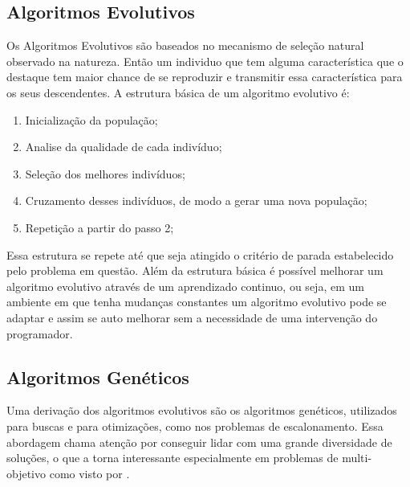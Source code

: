     \subsection{Algoritmos Evolutivos}
        Os Algoritmos Evolutivos são baseados no mecanismo de seleção natural observado na natureza. Então um individuo que tem alguma característica que o destaque tem maior chance de se reproduzir e transmitir essa característica para os seus descendentes.\newline
        A estrutura básica de um algoritmo evolutivo é:
        \begin{enumerate}
            \item Inicialização da população;
            \item Analise da qualidade de cada indivíduo;
            \item Seleção dos melhores indivíduos;
            \item Cruzamento desses indivíduos, de modo a gerar uma nova população;
            \item Repetição a partir do passo 2;
        \end{enumerate}
        Essa estrutura se repete até que seja atingido o critério de parada estabelecido pelo problema em questão.\newline
        Além da estrutura básica é possível melhorar um algoritmo evolutivo através de um aprendizado continuo, ou seja, em um ambiente em que tenha mudanças constantes um algoritmo evolutivo pode se adaptar e assim se auto melhorar sem a necessidade de uma intervenção do programador.


    \subsection{Algoritmos Genéticos}
        Uma derivação dos algoritmos evolutivos são os algoritmos genéticos, utilizados para buscas e para otimizações, como nos problemas de escalonamento. Essa abordagem chama atenção por conseguir lidar com uma grande diversidade de soluções, o que a torna interessante especialmente em problemas de multi-objetivo como visto por \cite{Bagchi1999}.\hfill\vspace{\onelineskip}
        
